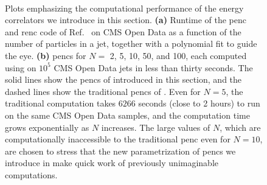 \begin{figure}[t!]
    $\qquad$
    \caption[Plots emphasizing the computational performance of our new parametrizations for energy correlators.]
    {
        Plots emphasizing the computational performance of the energy correlators we introduce in this section.
        \textbf{(a)}
        Runtime of the \gls{penc} and \gls{renc} code of Ref.~\cite{github:RENC} on CMS Open Data as a function of the number of particles in a jet, together with a polynomial fit to guide the eye.
        \textbf{(b)}
        \glspl{penc} for $N=$ 2, 5, 10, 50, and 100, each computed using on \(10^5\) CMS Open Data jets in less than thirty seconds.
        The solid lines show the \glspl{penc} of  introduced in this section, and the dashed lines show the traditional \glspl{penc} of .
        Even for $N=5$, the traditional computation takes $6266$ seconds (close to 2 hours) to run on the same CMS Open Data samples, and the computation time grows exponentially as $N$ increases.
        The large values of $N$, which are computationally inaccessible to the traditional \gls{penc} even for $N=10$, are chosen to stress that the new parametrization of \glspl{penc} we introduce in  make quick work of previously unimaginable computations.
    }
	\label{fig:runtime}%
\end{figure}





